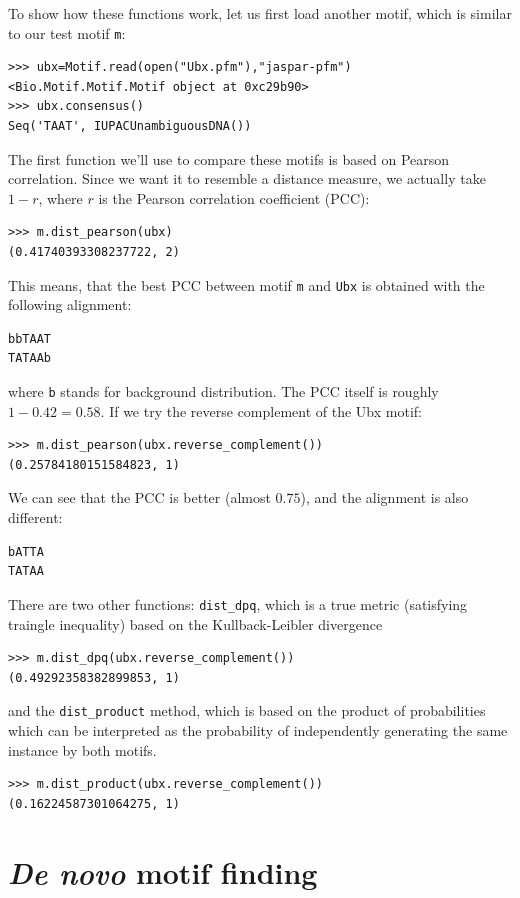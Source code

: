 \documentclass{report}
\begin{document}
To show how these functions work, let us first load another motif,
which is similar to our test motif \verb|m|:
\begin{verbatim}
>>> ubx=Motif.read(open("Ubx.pfm"),"jaspar-pfm")
<Bio.Motif.Motif.Motif object at 0xc29b90>
>>> ubx.consensus()
Seq('TAAT', IUPACUnambiguousDNA())
\end{verbatim}

The first function we'll use to compare these motifs is based on
Pearson correlation. Since we want it to resemble a distance
measure, we actually take $1-r$, where $r$ is the Pearson correlation
coefficient (PCC):
\begin{verbatim}
>>> m.dist_pearson(ubx)
(0.41740393308237722, 2)
\end{verbatim}
This means, that the best PCC between motif \verb|m| and  \verb|Ubx| is obtained with the following alignment:
\begin{verbatim}
bbTAAT
TATAAb
\end{verbatim}
where \verb|b| stands for background distribution. The PCC itself is
roughly $1-0.42=0.58$. If we try the reverse complement of the Ubx motif:

\begin{verbatim}
>>> m.dist_pearson(ubx.reverse_complement())
(0.25784180151584823, 1)
\end{verbatim}
We can see that the PCC is better (almost $0.75$), and the alignment is also different:
\begin{verbatim}
bATTA
TATAA
\end{verbatim}

There are two other functions: \verb|dist_dpq|, which is a true metric (satisfying traingle inequality) based on the Kullback-Leibler divergence 
\begin{verbatim}
>>> m.dist_dpq(ubx.reverse_complement())
(0.49292358382899853, 1)
\end{verbatim}

and the \verb|dist_product| method, which is based on the product of
probabilities which can be interpreted as the probability of
independently generating the same instance by both motifs.

\begin{verbatim}
>>> m.dist_product(ubx.reverse_complement())
(0.16224587301064275, 1)
\end{verbatim}

\section{\emph{De novo} motif finding}
\label{sec:find}
\end{document}
